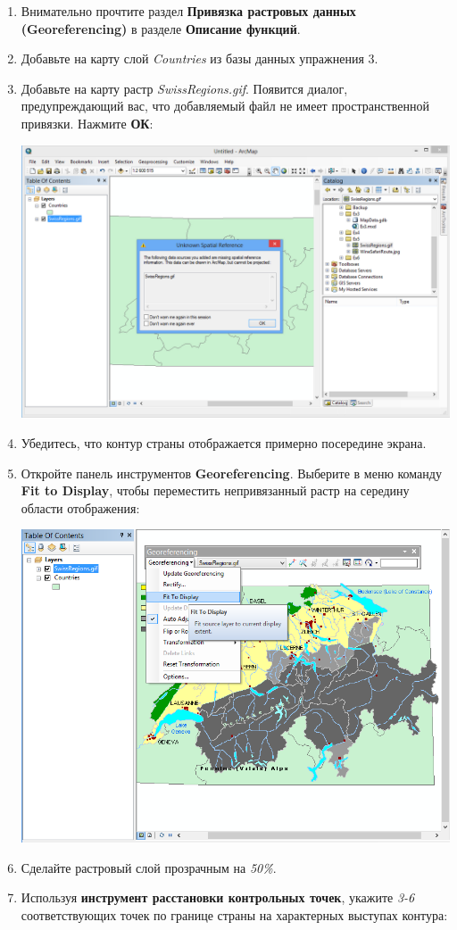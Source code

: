 \documentclass[12pt,]{book}
\begin{document}
\begin{enumerate}
\def\labelenumi{\arabic{enumi}.}
\item
  Внимательно прочтите раздел \textbf{Привязка растровых данных (Georeferencing)} в разделе \textbf{Описание функций}.
\item
  Добавьте на карту слой \emph{Countries} из базы данных упражнения 3.
\item
  Добавьте на карту растр \emph{SwissRegions.gif}. Появится диалог, предупреждающий вас, что добавляемый файл не имеет пространственной привязки. Нажмите \textbf{ОК}:

  \includegraphics{images/Ex05/image8.png}
\item
  Убедитесь, что контур страны отображается примерно посередине экрана.
\item
  Откройте панель инструментов \textbf{Georeferencing}. Выберите в меню команду \textbf{Fit to Display}, чтобы переместить непривязанный растр на середину области отображения:

  \includegraphics{images/Ex05/image9.png}
\item
  Сделайте растровый слой прозрачным на \emph{50\%}.
\item
  Используя \textbf{инструмент расстановки контрольных точек}, укажите \emph{3-6} соответствующих точек по границе страны на характерных выступах контура:


\end{enumerate}
\end{document}
